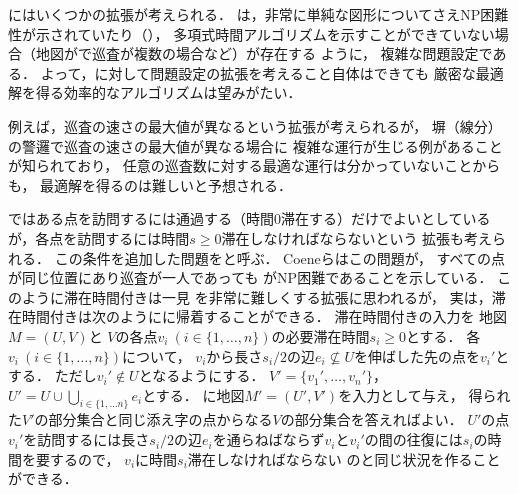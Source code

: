






{\PPProfit}にはいくつかの拡張が考えられる．
%
{\PPProfit}は，非常に単純な図形についてさえNP困難性が示されていたり（\cite[Theorems 5 and 6]{coene2011charlemagne}），
多項式時間アルゴリズムを示すことができていない場合（地図が{\graphLine}で巡査が複数の場合など）が存在する
ように，
複雑な問題設定である．
よって，{\PPProfit}に対して問題設定の拡張を考えること自体はできても
厳密な最適解を得る効率的なアルゴリズムは望みがたい．

例えば，巡査の速さの最大値が異なるという拡張が考えられるが，
塀（線分）の警邏で巡査の速さの最大値が異なる場合に
複雑な運行が生じる例があることが知られており\cite[Theorem~1]{kawamura2015fence}，
任意の巡査数に対する最適な運行は分かっていないことからも，
最適解を得るのは難しいと予想される．

\newcommand{\patProbWithDuration}{{滞在時間付き{\PPProfit}}}
%
{\PPProfit}ではある点を訪問するには通過する（時間$0$滞在する）だけでよいとしているが，各点を訪問するには時間$s \geq 0$滞在しなければならないという
拡張も考えられる．
この条件を追加した問題を\defword{{\patProbWithDuration}}と呼ぶ．
Coeneら\cite{coene2011charlemagne}はこの問題が，
すべての点が同じ位置にあり巡査が一人であっても
{\PP}がNP困難であることを示している\cite[Theorem~3]{coene2011charlemagne}．
%
このように{\patProbWithDuration}は一見
{\PPProfit}を非常に難しくする拡張に思われるが，
実は，{\patProbWithDuration}は次のように{\PPProfit}に帰着することができる．
{\patProbWithDuration}の入力を
地図$M = (U, V)$と
$V$の各点$v_i\ (i \in \{ 1, \ldots, n \})$の必要滞在時間$s_i \geq 0$とする．
各$v_i\ (i \in \{ 1, \ldots, n \})$について，
$v_i$から長さ$s_i/2$の辺$e_i \not\subseteq U$を伸ばした先の点を$v_i'$とする．
ただし$v_i' \notin U$となるようにする．
$V' = \{ v_1', \ldots, v_n' \}$，
$U' = U \cup \bigcup_{i \in \{ 1, \ldots n \}} e_i$とする．
{\PPProfit}に地図$M' = (U', V')$を入力として与え，
得られた$V'$の部分集合と同じ添え字の点からなる$V$の部分集合を答えればよい．
%
$U'$の点$v_i'$を訪問するには長さ$s_i/2$の辺$e_i$を通らねばならず$v_i$と$v_i'$の間の往復には$s_i$の時間を要するので，
$v_i$に時間$s_i$滞在しなければならない
のと同じ状況を作ることができる．

